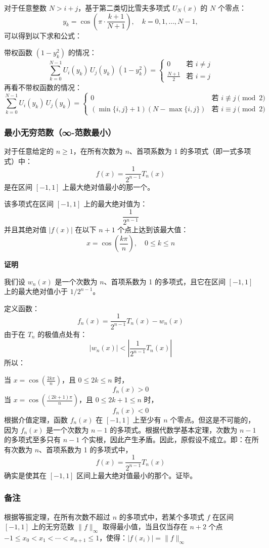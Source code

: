 对于任意整数 $N > i + j$，基于第二类切比雪夫多项式 $U_N(x)$ 的 $N$ 个零点：
$$
y_k = \cos\left( \pi \cdot \frac{k + 1}{N + 1} \right),\quad k = 0, 1, \dots, N - 1,~
$$
可以得到以下求和公式：

带权函数 $(1 - y_k^2)$ 的情况：
$$
\sum_{k = 0}^{N - 1} U_i(y_k)\, U_j(y_k)\, (1 - y_k^2) =
\begin{cases}
0 & \text{若 } i \ne j \\
\frac{N + 1}{2} & \text{若 } i = j
\end{cases}~
$$
再看不带权函数的情况：
$$
\sum_{k = 0}^{N - 1} U_i(y_k)\, U_j(y_k) =
\begin{cases}
0 & \text{若 } i \not\equiv j \pmod{2} \\
(\min\{i, j\} + 1) (N - \max\{i, j\}) & \text{若 } i \equiv j \pmod{2}
\end{cases}~
$$
\subsubsection{最小无穷范数（∞-范数最小）}
对于任意给定的 $n \geq 1$，在所有次数为 $n$、首项系数为 1 的多项式（即一式多项式）中：
$$
f(x) = \frac{1}{2^{n - 1}} T_n(x)~
$$
是在区间 $[-1,1]$ 上最大绝对值最小的那一个。

该多项式在区间 $[-1,1]$ 上的最大绝对值为：
$$
\frac{1}{2^{n - 1}}~
$$
并且其绝对值 $|f(x)|$ 在以下 $n + 1$ 个点上达到该最大值：
$$
x = \cos\left( \frac{k\pi}{n} \right), \quad 0 \leq k \leq n~
$$

\textbf{证明}

我们设 $w_n(x)$ 是一个次数为 $n$、首项系数为 1 的多项式，且它在区间 $[-1,1]$ 上的最大绝对值小于 $1/2^{n-1}$。

定义函数：
$$
f_n(x) = \frac{1}{2^{n-1}} T_n(x) - w_n(x)~
$$
由于在 $T_n$ 的极值点处有：
$$
|w_n(x)| < \left| \frac{1}{2^{n-1}} T_n(x) \right|~
$$
所以：

当 $x = \cos\left(\frac{2k\pi}{n}\right)$，且 $0 \leq 2k \leq n$ 时，
  $$
  f_n(x) > 0~
  $$
当 $x = \cos\left(\frac{(2k + 1)\pi}{n}\right)$，且 $0 \leq 2k + 1 \leq n$ 时，
  $$
  f_n(x) < 0~
  $$
根据介值定理，函数 $f_n(x)$ 在 $[-1,1]$ 上至少有 $n$ 个零点。但这是不可能的，因为 $f_n(x)$ 是一个次数为 $n - 1$ 的多项式。根据代数学基本定理，次数为 $n - 1$ 的多项式至多只有 $n - 1$ 个实根，因此产生矛盾。因此，原假设不成立。即：在所有次数为 $n$、首项系数为 1 的多项式中，
$$
f(x) = \frac{1}{2^{n-1}} T_n(x)~
$$
确实是使其在 $[-1,1]$ 区间上最大绝对值最小的那个。证毕。
\subsubsection{备注}
根据等振定理，在所有次数不超过 $n$ 的多项式中，若某个多项式 $f$ 在区间 $[-1,1]$ 上的无穷范数 $\|f\|_\infty$ 取得最小值，当且仅当存在 $n + 2$ 个点 $-1 \leq x_0 < x_1 < \cdots < x_{n+1} \leq 1$，使得：$|f(x_i)| = \|f\|_\infty$

